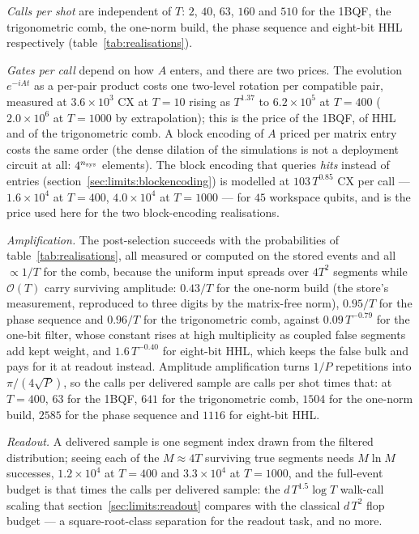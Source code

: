 \documentclass[11pt,a4paper]{article}
\begin{document}
\emph{Calls per shot} are independent of $T$: $2$, $40$, $63$, $160$ and
$510$ for the 1BQF, the trigonometric comb, the one-norm build, the phase
sequence and eight-bit HHL respectively (table~\ref{tab:realisations}).

\emph{Gates per call} depend on how $A$ enters, and there are two prices.
The evolution $e^{-iAt}$ as a per-pair product costs one two-level rotation
per compatible pair, measured at $3.6\times10^{3}$ CX at $T=10$ rising as
$T^{1.37}$ to $6.2\times10^{5}$ at $T=400$ ($2.0\times10^{6}$ at $T=1000$
by extrapolation); this is the price of the 1BQF, of HHL and of the
trigonometric comb. A block encoding of $A$ priced per matrix entry costs
the same order (the dense dilation of the simulations is not a deployment
circuit at all: $4^{n_{\rm sys}}$ elements). The block encoding that
queries \emph{hits} instead of entries (section~\ref{sec:limits:blockencoding})
is modelled at $103\,T^{0.85}$ CX per call --- $1.6\times10^{4}$ at
$T=400$, $4.0\times10^{4}$ at $T=1000$ --- for $45$ workspace qubits, and
is the price used here for the two block-encoding realisations.

\emph{Amplification.} The post-selection succeeds with the probabilities of
table~\ref{tab:realisations}, all measured or computed on the stored events
and all $\propto1/T$ for the comb, because the uniform input spreads over
$4T^{2}$ segments while $\mathcal{O}(T)$ carry surviving amplitude:
$0.43/T$ for the one-norm build (the store's measurement, reproduced to
three digits by the matrix-free norm), $0.95/T$ for the phase sequence and
$0.96/T$ for the trigonometric comb, against $0.09\,T^{-0.79}$ for the
one-bit filter, whose constant rises at high multiplicity as coupled false
segments add kept weight, and $1.6\,T^{-0.40}$ for eight-bit HHL, which
keeps the false bulk and pays for it at readout instead. Amplitude
amplification turns $1/P$ repetitions into $\pi/(4\sqrt{P})$, so the calls
per delivered sample are calls per shot times that: at $T=400$, $63$ for the
1BQF, $641$ for the trigonometric comb, $1504$ for the one-norm build,
$2585$ for the phase sequence and $1116$ for eight-bit HHL.

\emph{Readout.} A delivered sample is one segment index drawn from the
filtered distribution; seeing each of the $M\approx4T$ surviving true
segments needs $M\ln M$ successes, $1.2\times10^{4}$ at $T=400$ and
$3.3\times10^{4}$ at $T=1000$, and the full-event budget is that times the
calls per delivered sample: the $d\,T^{1.5}\log T$ walk-call scaling that
section~\ref{sec:limits:readout} compares with the classical
$d\,T^{2}$ flop budget --- a square-root-class separation for the readout
task, and no more.
\end{document}
